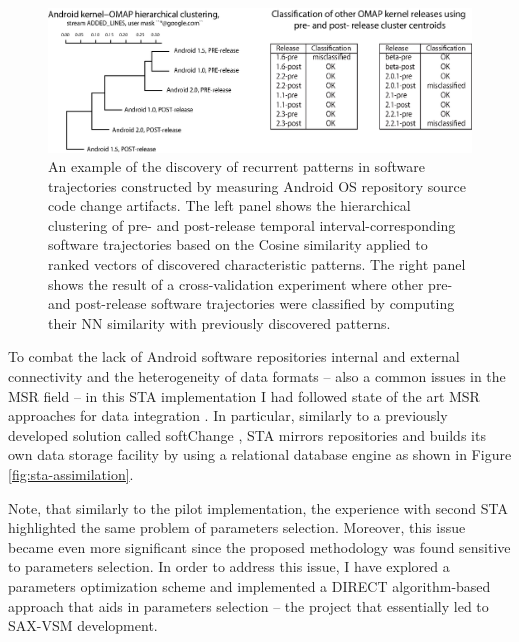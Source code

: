 \begin{figure}[t]
   \centering
   \includegraphics[width=145mm]{figures/STA2.eps}
   \caption[An example of the discovery of recurrent patterns in software trajectories constructed by measuring Android OS repository source code change artifacts.]
   {An example of the discovery of recurrent patterns in software trajectories constructed by measuring Android OS repository source code change artifacts.
   The left panel shows the hierarchical clustering of pre- and post-release temporal interval-corresponding software 
   trajectories based on the Cosine similarity applied to ranked vectors of discovered characteristic patterns.
   The right panel shows the result of a cross-validation experiment where other pre- and post-release software trajectories 
   were classified by computing their NN similarity with previously discovered patterns.}
   \label{fig:STA2-results}
\end{figure}

To combat the lack of Android software repositories internal and external connectivity and the heterogeneity of data formats -- also a common issues in the MSR field -- in this STA implementation I had followed state of the art MSR approaches for data integration \cite{citeulike:13058334} \cite{cvsanaly}. In particular, similarly to a previously developed solution called softChange \cite{german04_softchange}, STA mirrors repositories and builds its own data storage facility by using a relational database engine as shown in Figure \ref{fig:sta-assimilation}.

Note, that similarly to the pilot implementation, the experience with second STA highlighted the same problem of parameters selection. Moreover, this issue became even more significant since the proposed methodology was found sensitive to parameters selection. In order to address this issue, I have explored a parameters optimization scheme and implemented a DIRECT algorithm-based approach \cite{citeulike:12563460} that aids in parameters selection -- the project that essentially led to SAX-VSM development.

